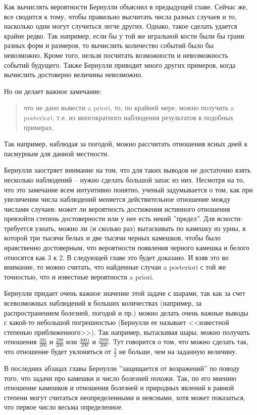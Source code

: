 \documentclass[12pt]{extarticle}
\begin{document}
Как вычислять вероятности Бернулли объяснил в предыдущей главе.
Сейчас же, все сводится к тому, чтобы правильно высчитать числа разных случаев и то, насколько одни могут случиться легче других.
Однако, такое сделать удается крайне редко.
Так например, если бы у той же игральной кости были бы грани разных форм и размеров, то вычислить количество событий было бы невозможно.  
Кроме того, нельзя посчитать возможности и невозможность событий будущего.
Также Бернулли приводит много других примеров, когда вычислить достоверно величины невозможно.

Но он делает важное замечание:
\begin{quote}
что не дано вывести a priori, то, по крайней мере, можно получить a posteriori, т.е. из многократного наблюдения результатов в подобных примерах.
\end{quote}
Так например, наблюдая за погодой, можно рассчитать отношения ясных дней к пасмурным для данной местности.

Бернулли заостряет внимание на том, что для таких выводов не достаточно взять несколько наблюдений -- нужно сделать большой запас из них. 
Несмотря на то, что это замечание всем интуитивно понятно, ученый задумывается о том, как при увеличении числа наблюдений меняется действительное отношение между числами случаев: может ли вероятность достижения истинного отношения превзойти степень достоверности или у нее есть некий ''предел''.
Для ясности: требуется узнать, можно ли (и сколько раз) вытаскивать по камешку из урны, в которой три тысячи белых и две тысячи черных камешков, чтобы было нравственно достоверным, что вероятности появления черного камешка и белого относятся как 3 к 2.
В следующей главе это будет доказано.
И взяв это во внимание, то можно считать, что найденные случаи a posteriori с той же точностью, что и известные вероятности a priori.

Бернулли придает очень важное значение этой задаче с шарами, так как за счет всевозможных наблюдений в больших количествах (например, за распространением болезней, погодой и пр.) можно делать очень важные выводы с какой-то небольшой погрешностью (Бернулли ее называет <<известной степенью приближенного>>).
Так например, вытаскивая шары, можно получить отношения $\frac{301}{200}$ и $\frac{299}{200}$ или $\frac{3001}{200}$ и $\frac{2999}{200}$.
Тут говорится о том, что можно сделать так, что отношение будет уклоняться от $\frac{3}{2}$ не больше, чем на заданную величину.

В последних абзацах главы Бернулли ''защищается от возражений'' по поводу того, что задачи про камешки и число болезней похожи.
Так, по его мнению отношение камешков и отношения болезней и природных явлений в равной степени могут считаться неопределенными и неясными, хотя может показаться, что первое число весьма определенное.
\end{document}
